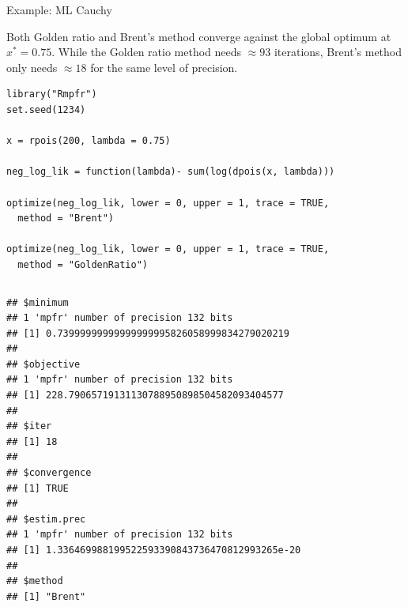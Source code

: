 \documentclass[11pt,compress,t,notes=noshow, xcolor=table]{beamer}
\begin{document}
\begin{vbframe}{Example: ML Cauchy}
\framebreak 

Both Golden ratio and Brent's method converge against the global optimum at $x^\ast = 0.75$. While the Golden ratio method needs $\approx 93$ iterations, Brent's method only needs $\approx 18$ for the same level of precision. 

\lz
\footnotesize
\begin{verbatim}
library("Rmpfr")
set.seed(1234)

x = rpois(200, lambda = 0.75)

neg_log_lik = function(lambda)- sum(log(dpois(x, lambda)))

optimize(neg_log_lik, lower = 0, upper = 1, trace = TRUE, 
  method = "Brent")

optimize(neg_log_lik, lower = 0, upper = 1, trace = TRUE, 
  method = "GoldenRatio")

\end{verbatim}







\framebreak 






\vspace*{-1cm}

\begin{columns}
\begin{column}{1\textwidth}
\begin{verbatim}
## $minimum
## 1 'mpfr' number of precision 132 bits
## [1] 0.73999999999999999995826058999834279020219
##
## $objective
## 1 'mpfr' number of precision 132 bits
## [1] 228.79065719131130788950898504582093404577
##
## $iter
## [1] 18
##
## $convergence
## [1] TRUE
##
## $estim.prec
## 1 'mpfr' number of precision 132 bits
## [1] 1.336469988199522593390843736470812993265e-20
##
## $method
## [1] "Brent"
\end{verbatim}
\end{column}
\end{columns}


\end{vbframe}
\end{document}

